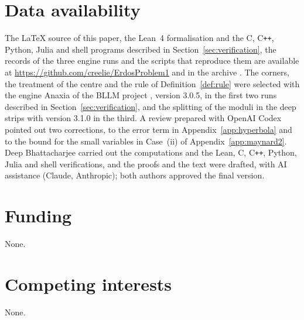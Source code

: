 \documentclass[aps,prd,twocolumn,superscriptaddress,nofootinbib,longbibliography,floatfix,showkeys,nobalancelastpage,amsmath,amssymb,10pt]{revtex4-2}
\theoremstyle{plain}
\theoremstyle{definition}
\theoremstyle{plain}
\newcommand{\repoURL}{https://github.com/creelie/ErdosProblem1}
\begin{document}
\section*{Data availability}
\begingroup\raggedright
The \LaTeX{} source of this paper, the Lean~4 formalisation and the C, C\texttt{++}, Python, Julia and shell programs described in Section~\ref{sec:verification}, the records of the three engine runs and the scripts that reproduce them are available at \url{\repoURL} and in the archive \cite{Zen}. The corners, the treatment of the centre and the rule of Definition~\ref{def:rule} were selected with the engine Anaxia of the BLLM project \cite{Ana,BLLM}, version 3.0.5, in the first two runs described in Section~\ref{sec:verification}, and the splitting of the moduli in the deep strips with version 3.1.0 \cite{Ana31} in the third. A review prepared with OpenAI Codex pointed out two corrections, to the error term in Appendix~\ref{app:hyperbola} and to the bound for the small variables in Case~(ii) of Appendix~\ref{app:maynard2}. Deep Bhattacharjee carried out the computations and the Lean, C, C\texttt{++}, Python, Julia and shell verifications, and the proofs and the text were drafted, with AI assistance (Claude, Anthropic); both authors approved the final version.\par
\endgroup

\section*{Funding}
None.

\section*{Competing interests}
None.
\end{document}
